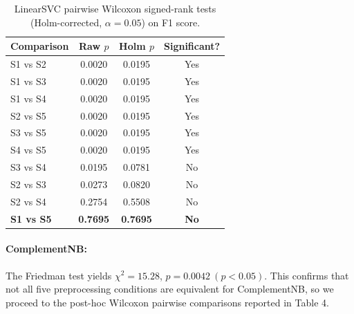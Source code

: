 \documentclass[a4paper,10pt]{article}
\begin{document}
\begin{table}[h]
\centering
\label{tab:svm_pairwise}
\begin{tabular}{|l|c|c|c|}
\hline
\textbf{Comparison} & \textbf{Raw $p$} & \textbf{Holm $p$} & \textbf{Significant?} \\
\hline
S1 vs S2  & 0.0020 & 0.0195 & Yes \\
S1 vs S3  & 0.0020 & 0.0195 & Yes \\
S1 vs S4  & 0.0020 & 0.0195 & Yes \\
S2 vs S5  & 0.0020 & 0.0195 & Yes \\
S3 vs S5  & 0.0020 & 0.0195 & Yes \\
S4 vs S5  & 0.0020 & 0.0195 & Yes \\
S3 vs S4  & 0.0195 & 0.0781 & No  \\
S2 vs S3  & 0.0273 & 0.0820 & No  \\
S2 vs S4  & 0.2754 & 0.5508 & No  \\
\textbf{S1 vs S5}  & \textbf{0.7695} & \textbf{0.7695} & \textbf{No} \\
\hline
\end{tabular}
\caption{LinearSVC pairwise Wilcoxon signed-rank tests (Holm-corrected,
         $\alpha = 0.05$) on F1 score.}
\end{table}

\paragraph{ComplementNB:} The Friedman test yields $\chi^2 = 15.28$, $p = 0.0042 \ (p < 0.05)$. This confirms that not all five preprocessing conditions are equivalent for ComplementNB, so we proceed to the post-hoc Wilcoxon pairwise comparisons reported in Table 4.
\end{document}
